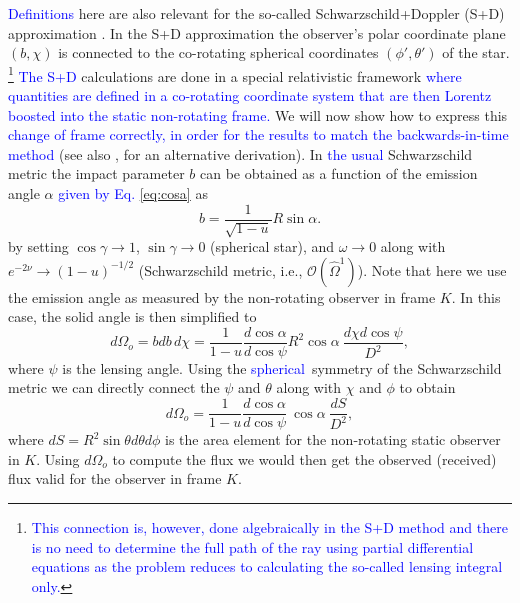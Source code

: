 \documentclass{aa}
\newcommand{\be}{\begin{equation}}
\newcommand{\ee}{\end{equation}}
\newcommand{\refe}[1]{\textcolor{blue}{{#1}}}
\newcommand{\sch}{Schwarzschild }
\newcommand{\Ob}{\ensuremath{\hat{\Omega}}}
\begin{document}
\refe{Definitions} here are also relevant for the so-called Schwarzschild+Doppler (S+D) approximation \cite[see e.g.,][]{PB06}.
In the S+D approximation the observer's polar coordinate plane $(b,\chi)$ is connected to the co-rotating spherical coordinates $(\phi', \theta')$ of the star.%
\footnote{\refe{This connection is, however, done algebraically in the S+D method and there is no need to determine the full path of the ray using partial differential equations as the problem reduces to calculating the so-called lensing integral only.}
}
\refe{The S+D} calculations are done in a special relativistic framework \refe{where quantities are defined in a co-rotating coordinate system that are then Lorentz boosted into the static non-rotating frame.}
We will now show how to express this \refe{change of frame correctly, in order for the results to match the backwards-in-time method} (see also \citealt{CML07}, for an alternative derivation).
In \refe{the usual} \sch metric the impact parameter $b$ can be obtained as a function of the emission angle $\alpha$ \refe{given by Eq.} \eqref{eq:cosa} as
\be
b = \frac{1}{\sqrt{1-u}} R \sin\alpha.
\ee
by setting $\cos\gamma \rightarrow 1$, $\sin\gamma \rightarrow 0$ (spherical star), and $\omega \rightarrow 0$ along with $e^{-2\nu} \rightarrow (1-u)^{-1/2}$ (\sch metric, i.e., $\mathcal{O}(\Ob^1)$).
Note that here we use the emission angle as measured by the non-rotating observer in frame $K$.
In this case, the solid angle is then simplified to 
\be
d\Omega_o = bdb \, d\chi = \frac{1}{1-u} \frac{d \cos\alpha}{d \cos\psi} R^2 \cos\alpha ~ \frac{d\chi d\cos\psi}{D^2},
\ee
where $\psi$ is the lensing angle.
Using the \refe{spherical} symmetry of the \sch metric we can directly connect the $\psi$ and $\theta$ along with $\chi$ and $\phi$ to obtain
\be
d\Omega_o = \frac{1}{1-u} \frac{d \cos\alpha}{d \cos\psi} ~\cos\alpha ~ \frac{dS}{D^2},
\ee
where $dS = R^2 \sin\theta d\theta d\phi$ is the area element for the non-rotating static observer in $K$.
Using $d\Omega_o$ to compute the flux we would then get the observed (received) flux valid for the observer in frame $K$.
\end{document}
